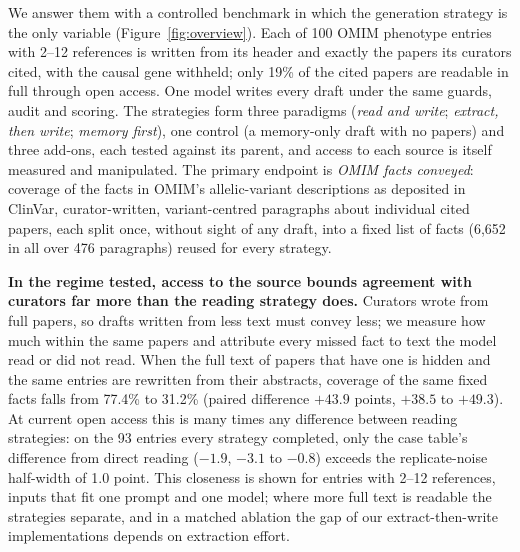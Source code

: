 \documentclass{article} %
\begin{document}
We answer them with a controlled benchmark in which the generation strategy is the only variable (Figure~\ref{fig:overview}). Each of 100 OMIM phenotype entries with 2--12 references is written from its header and exactly the papers its curators cited, with the causal gene withheld; only 19\% of the cited papers are readable in full through open access. One model writes every draft under the same guards, audit and scoring. The strategies form three paradigms (\emph{read and write}; \emph{extract, then write}; \emph{memory first}), one control (a memory-only draft with no papers) and three add-ons, each tested against its parent, and access to each source is itself measured and manipulated. The primary endpoint is \emph{OMIM facts conveyed}: coverage of the facts in OMIM's allelic-variant descriptions as deposited in ClinVar, curator-written, variant-centred paragraphs about individual cited papers, each split once, without sight of any draft, into a fixed list of facts (6,652 in all over 476 paragraphs) reused for every strategy.

\textbf{In the regime tested, access to the source bounds agreement with curators far more than the reading strategy does.} Curators wrote from full papers, so drafts written from less text must convey less; we measure how much within the same papers and attribute every missed fact to text the model read or did not read. When the full text of papers that have one is hidden and the same entries are rewritten from their abstracts, coverage of the same fixed facts falls from 77.4\% to 31.2\% (paired difference $+43.9$ points, $+38.5$ to $+49.3$). At current open access this is many times any difference between reading strategies: on the 93 entries every strategy completed, only the case table's difference from direct reading ($-1.9$, $-3.1$ to $-0.8$) exceeds the replicate-noise half-width of 1.0 point. This closeness is shown for entries with 2--12 references, inputs that fit one prompt and one model; where more full text is readable the strategies separate, and in a matched ablation the gap of our extract-then-write implementations depends on extraction effort.
\end{document}
